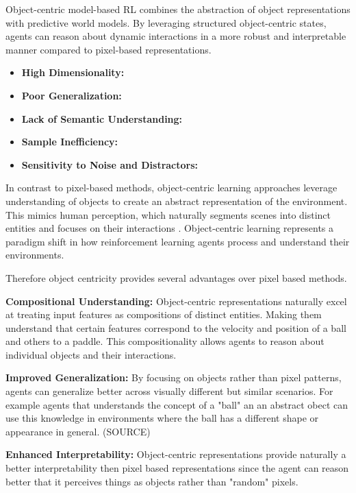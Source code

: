 \documentclass[
	english,
	ruledheaders=section,
	class=report,
	thesis={type=master},
	accentcolor=9c,
	custommargins=true,
	marginpar=false,
	parskip=half-,
	fontsize=11pt,
]{tudapub}
\begin{document}
Object-centric model-based RL combines the abstraction of object
representations with predictive world models. By leveraging structured
object-centric states, agents can reason about dynamic interactions in a more
robust and interpretable manner compared to pixel-based representations.

\begin{itemize}
	\item \textbf{High Dimensionality:}
	\item \textbf{Poor Generalization:}
	\item \textbf{Lack of Semantic Understanding:}
	\item \textbf{Sample Inefficiency:}
	\item \textbf{Sensitivity to Noise and Distractors:}
\end{itemize}

In contrast to pixel-based methods, object-centric learning approaches leverage
understanding of objects to create an abstract representation of the
environment. This mimics human perception, which naturally segments scenes into
distinct entities and focuses on their interactions
\cite{nanbo2021learningobjectcentricrepresentationsmultiobject}. Object-centric
learning represents a paradigm shift in how reinforcement learning agents
process and understand their environments.

Therefore object centricity provides several advantages over pixel based
methods.

\textbf{Compositional Understanding:} Object-centric representations naturally excel at treating input features as compositions of distinct entities. Making them understand that certain features
correspond to the velocity and position of a ball and others to a paddle. This compositionality allows agents to reason about individual objects and their interactions.

\textbf{Improved Generalization:} By focusing on objects rather than pixel patterns, agents can generalize better across visually different but similar scenarios. For example agents that
understands the concept of a "ball" an an abstract obect can use this knowledge in environments where the ball has a different shape or appearance in general. (SOURCE)

\textbf{Enhanced Interpretability:} Object-centric representations provide naturally a better interpretability then pixel based representations since the agent can reason better that it perceives things as objects rather than "random" pixels.
\end{document}

